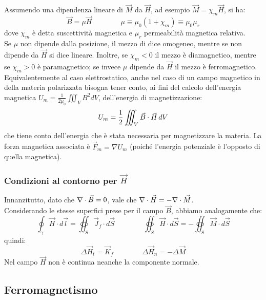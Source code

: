 \documentclass[]{article}
\begin{document}
%
Assumendo una dipendenza lineare di $ \vec{M} $ da $ \vec{H} $, ad esempio $ \vec{M} = \chi_m \vec{H} $, si ha:
\begin{equation}
	\vec{B} = \mu\vec{H} \qquad\qquad \mu \equiv \mu_0 (1 + \chi_m) \equiv \mu_0 \mu_r
	\label{eq:24}
\end{equation}
dove $ \chi_m $ è detta suscettività magnetica e $ \mu_r $ permeabilità magnetica relativa. \\ 
%
Se $ \mu $ non dipende dalla posizione, il mezzo di dice omogeneo, mentre se non dipende da $ \vec{H} $ si dice lineare. Inoltre, se $ \chi_m < 0 $ il mezzo è diamagnetico, mentre se $ \chi_m > 0 $ è paramagnetico; se invece $ \mu $ dipende da $ \vec{H} $ il mezzo è ferromagnetico. \\ 
Equivalentemente al caso elettrostatico, anche nel caso di un campo magnetico in della materia polarizzata bisogna tener conto, ai fini del calcolo dell'energia magnetica $ U_m = \frac{1}{2\mu_0}\iiint_V B^2 dV $, dell'energia di magnetizzazione:
\begin{equation}
	U_m = \frac{1}{2} \iiint_V \vec{B}\cdot\vec{H} \,dV
	\label{eq:25}
\end{equation}
che tiene conto dell'energia che è stata necessaria per magnetizzare la materia. La forza magnetica associata è $ \vec{F}_m = \nabla U_m $ (poiché l'energia potenziale è l'opposto di quella magnetica).

\subsubsection{Condizioni al contorno per $ \vec{H} $}

Innanzitutto, dato che $ \nabla\cdot\vec{B} = 0 $, vale che $ \nabla\cdot\vec{H} = -\nabla\cdot\vec{M} $. \\ 
%
Considerando le stesse superfici prese per il campo $ \vec{B} $, abbiamo analogamente che:
\begin{equation}
	\oint_{\gamma} \vec{H} \cdot d\vec{l} = \oiint_S \vec{J}_f \cdot d\vec{S} \qquad\qquad \oiint_S \vec{H}\cdot d\vec{S} =	- \oiint_S \vec{M}\cdot d\vec{S}
	\label{eq:26}
\end{equation}
quindi:
\begin{equation}
	\Delta\vec{H}_t = \vec{K}_f \qquad\qquad \Delta\vec{H}_n = - \Delta\vec{M}
	\label{eq:27}
\end{equation}
Nel campo $ \vec{H} $ non è continua neanche la componente normale.

\subsection{Ferromagnetismo}
\end{document}
